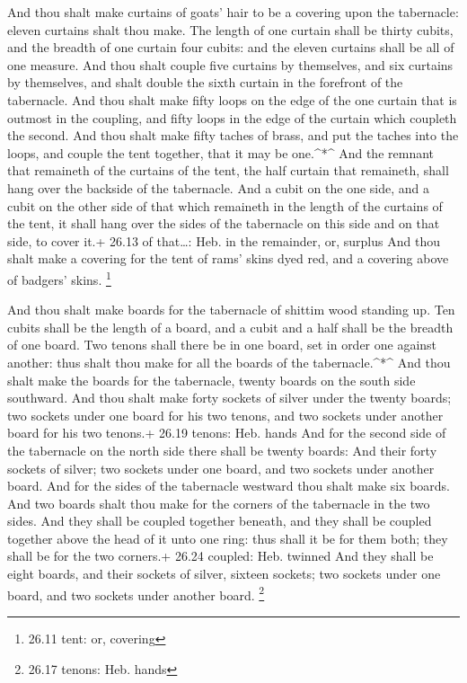  And thou shalt make curtains of goats' hair to be a
covering upon the tabernacle: eleven curtains shalt thou make.
 The length of one curtain shall be thirty cubits, and the
breadth of one curtain four cubits: and the eleven curtains shall be all
of one measure.  And thou shalt couple five curtains by
themselves, and six curtains by themselves, and shalt double the sixth
curtain in the forefront of the tabernacle.  And thou shalt
make fifty loops on the edge of the one curtain that is outmost in the
coupling, and fifty loops in the edge of the curtain which coupleth the
second.  And thou shalt make fifty taches of brass, and put
the taches into the loops, and couple the tent together, that it may be
one.\^{}*\^{}  And the remnant that remaineth of the
curtains of the tent, the half curtain that remaineth, shall hang over
the backside of the tabernacle.  And a cubit on the one
side, and a cubit on the other side of that which remaineth in the
length of the curtains of the tent, it shall hang over the sides of the
tabernacle on this side and on that side, to cover it.+ 26.13 of
that\ldots: Heb. in the remainder, or, surplus  And thou
shalt make a covering for the tent of rams' skins dyed red, and a
covering above of badgers' skins. \footnote{26.11 tent: or, covering}

 And thou shalt make boards for the tabernacle of shittim
wood standing up.  Ten cubits shall be the length of a
board, and a cubit and a half shall be the breadth of one board.
 Two tenons shall there be in one board, set in order one
against another: thus shalt thou make for all the boards of the
tabernacle.\^{}*\^{}  And thou shalt make the boards for
the tabernacle, twenty boards on the south side southward. 
And thou shalt make forty sockets of silver under the twenty boards; two
sockets under one board for his two tenons, and two sockets under
another board for his two tenons.+ 26.19 tenons: Heb. hands
 And for the second side of the tabernacle on the north
side there shall be twenty boards:  And their forty sockets
of silver; two sockets under one board, and two sockets under another
board.  And for the sides of the tabernacle westward thou
shalt make six boards.  And two boards shalt thou make for
the corners of the tabernacle in the two sides.  And they
shall be coupled together beneath, and they shall be coupled together
above the head of it unto one ring: thus shall it be for them both; they
shall be for the two corners.+ 26.24 coupled: Heb. twinned 
And they shall be eight boards, and their sockets of silver, sixteen
sockets; two sockets under one board, and two sockets under another
board. \footnote{26.17 tenons: Heb. hands}


